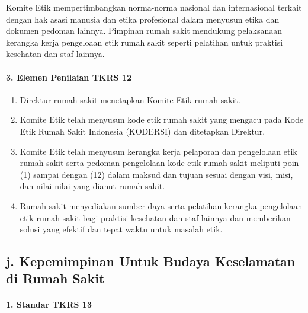 \documentclass[
]{book}
\providecommand{\tightlist}{%
  \setlength{\itemsep}{0pt}\setlength{\parskip}{0pt}}
\begin{document}
Komite Etik mempertimbangkan norma-norma nasional dan internasional terkait dengan hak asasi manusia dan etika profesional dalam menyusun etika dan dokumen pedoman lainnya.
Pimpinan rumah sakit mendukung pelaksanaan kerangka kerja pengeloaan etik rumah sakit seperti pelatihan untuk praktisi kesehatan dan staf lainnya.

\hypertarget{elemen-penilaian-tkrs-12}{%
\paragraph*{3. Elemen Penilaian TKRS 12}\label{elemen-penilaian-tkrs-12}}

\begin{enumerate}
\def\labelenumi{\alph{enumi}.}
\tightlist
\item
  Direktur rumah sakit menetapkan Komite Etik rumah sakit.
\item
  Komite Etik telah menyusun kode etik rumah sakit yang mengacu pada Kode Etik Rumah Sakit Indonesia (KODERSI) dan ditetapkan Direktur.
\item
  Komite Etik telah menyusun kerangka kerja pelaporan dan pengelolaan etik rumah sakit serta pedoman pengelolaan kode etik rumah sakit meliputi poin (1) sampai dengan (12) dalam maksud dan tujuan sesuai dengan visi, misi, dan nilai-nilai yang dianut rumah sakit.
\item
  Rumah sakit menyediakan sumber daya serta pelatihan kerangka pengelolaan etik rumah sakit bagi praktisi kesehatan dan staf lainnya dan memberikan solusi yang efektif dan tepat waktu untuk masalah etik.
\end{enumerate}

\hypertarget{j.-kepemimpinan-untuk-budaya-keselamatan-di-rumah-sakit}{%
\subsection*{j. Kepemimpinan Untuk Budaya Keselamatan di Rumah Sakit}\label{j.-kepemimpinan-untuk-budaya-keselamatan-di-rumah-sakit}}

\hypertarget{standar-tkrs-13}{%
\paragraph*{1. Standar TKRS 13}\label{standar-tkrs-13}}
\end{document}
